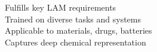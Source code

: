 \documentclass[preview]{standalone}
\begin{document}
Fulfills key LAM requirements\\Trained on diverse tasks and systems\\Applicable to materials, drugs, batteries\\Captures deep chemical representation\\
\end{document}
